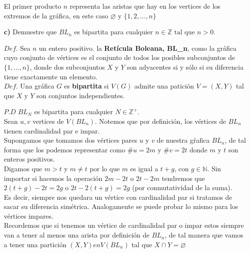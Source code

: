 \documentclass[12pt]{article}
\begin{document}
El primer producto $n$ representa las aristas que hay en los vertices de los extremos de la gráfica,
en este caso $\varnothing$ y $\{1, 2, ... , n\}$

\textbf{c)} Demuestre que $BL_n$ es bipartita para cualquier $n \in \mathbb{Z} \text{ tal que } n > 0$.

\begin{tcolorbox}[title=\textbf{Definiciones}, colback=blue!15!white, colframe=black!]
    $Def$. Sea $n$ un entero positivo. la \textbf{Retícula Boleana, BL\_n}, como
    la gráfica cuyo conjunto de vértices es el conjunto de todos los posibles subconjuntos
    de $\{1, ..., n\}$, donde dos subconjuntos $X$ y $Y$ son adyacentes si y sólo si su diferencia
    tiene exactamente un elemento.\\

    $Def.$ Una gráfica $G$ es \textbf{bipartita} si $V(G)$ admite una patición $V = (X, Y)$ tal que $X$ y $Y$ son conjuntos independientes.
\end{tcolorbox}

$P.D$ $BL_N$ es bipartita para cualquier $N \in \mathbb{Z^+}$.\\

Sean $u,v$ vertices de $V(BL_n)$. Notemos que por definición, los vértices de $BL_n$  tienen cardinalidad par e impar.\\

Supongamos que tomamos dos vértices pares $u$ y $v$ de nuestra gŕafica $BL_n$, de tal forma que los podemos representar
como $\# u  = 2m$ y $\# v = 2t$ donde $m$ y $t$ son enteros positivos.\\

Digamos que $m > t$ y $m \neq t$ por lo que $m$ es igual a $t + g$, con $g \in \mathbb{N}$. Sin 
importar si hacemos la operación $2 m - 2t$ o $2t - 2m$ tendremos que $2 (t + g) - 2t = 2g$ o $2t - 2(t + g) = 2g$ (por conmutatividad de la suma).\\

Es decir, siempre nos quedara un vértice con cardinalidad par si tratamos de sacar su diferencia simétrica. Analogamente se puede probar lo mismo para los vértices impares.\\

Recordemos que si tenemos un vértice de cardinalidad par o impar estos siempre van a tener al menos una arista por definición de $BL_n$, de 
tal manera que vamos a tener una partición $(X, Y) en V(BL_n)$ tal que $X \cap Y = \varnothing$ \\
\end{document}
